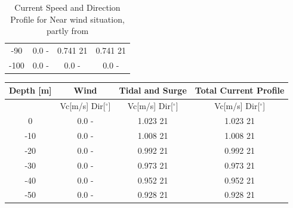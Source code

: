 \begin{table} [H]
\begin{tabular}{ |c|c|c|c|}
 -90 & 0.0 \hspace{0.7cm} - & 0.741 \hspace{0.7cm} 21  & 0.741 \hspace{1.15cm} 21 \\ 
 -100 & 0.0 \hspace{0.7cm} - & 0.0 \hspace{0.7cm} -  & 0.0 \hspace{1.15cm} - \\ 
 \hline
\end{tabular}
\caption{Current Speed and Direction Profile for Near wind situation, partly from \cite{Lifes50+D1.1}}
\label{table:tidcur}
\end{table}   

\begin{table} [H]
\centering
\begin{tabular}{ |c|c|c|c|}
\hline
Depth [m] & Wind & Tidal and Surge & Total Current Profile \\
 \hline
 \hline
 & Vc[m/s] \hspace{0.3cm} Dir[$^{\circ}$] &  Vc[m/s] \hspace{0.3cm} Dir[$^{\circ}$] & Vc[m/s] \hspace{0.3cm} Dir[$^{\circ}$] \\
 \hline
 0 & 0.0 \hspace{0.7cm} - & 1.023 \hspace{0.7cm} 21  & 1.023 \hspace{0.7cm} 21 \\
 -10 & 0.0 \hspace{0.7cm} - & 1.008 \hspace{0.7cm} 21  & 1.008 \hspace{0.7cm} 21 \\
 -20 & 0.0 \hspace{0.7cm} - & 0.992 \hspace{0.7cm} 21  & 0.992
 \hspace{0.7cm} 21 \\
 -30 & 0.0 \hspace{0.7cm} - & 0.973 \hspace{0.7cm} 21  & 0.973 \hspace{0.7cm} 21 \\
 -40 & 0.0 \hspace{0.7cm} - & 0.952 \hspace{0.7cm} 21  & 0.952 \hspace{0.7cm} 21 \\
 -50 & 0.0 \hspace{0.7cm} - & 0.928 \hspace{0.7cm} 21  & 0.928 \hspace{1.15cm} 21 \\

\end{tabular}
\end{table}
